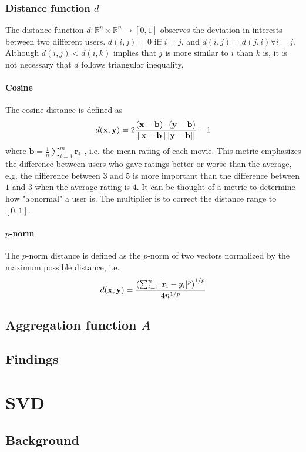 \documentclass[final]{cvpr}
\newcommand{\Par}[1]{\left(#1\right)}
\DeclarePairedDelimiter{\abs}{|}{|}
\DeclarePairedDelimiter{\norm}{\lVert}{\rVert}
\begin{document}
\subsubsection{Distance function $d$}
The distance function $d: \mathbb R^n \times \mathbb R^n \to [0, 1]$
observes the deviation in interests between two different users.
$d(i, j) = 0$ iff $i = j$, and $d(i, j) = d(j, i) \forall i = j$.
Although $d(i, j) < d(i, k)$ implies that $j$ is more similar to $i$ than $k$ is,
it is not necessary that $d$ follows triangular inequality.


\paragraph{Cosine}
The cosine distance is defined as
$$ d(\mathbf x, \mathbf y) = 2 \frac
{\Par{\mathbf x - \mathbf b} \cdot \Par{\mathbf y - \mathbf b}}
{\norm{\mathbf x - \mathbf b} \norm{\mathbf y - \mathbf b}} - 1 $$
where $\mathbf b = \frac1n \sum_{i=1}^m \mathbf r_{i\cdot}$,
i.e. the mean rating of each movie.
This metric emphasizes the difference between users who gave ratings better or worse than the average,
e.g. the difference between $3$ and $5$ is more important than the difference between $1$ and $3$
when the average rating is $4$.
It can be thought of a metric to determine how "abnormal" a user is.
The multiplier is to correct the distance range to $[0, 1]$.

\paragraph{$p$-norm}
The $p$-norm distance is defined as the $p$-norm of two vectors
normalized by the maximum possible distance, i.e.
$$ d(\mathbf x, \mathbf y) = \frac
{\Par{\sum_{i=1}^n \abs{x_i - y_i}^p}^{1/p}}
{4 n^{1/p}} $$

\subsection{Aggregation function $A$}


\subsection{Findings}

\section{\ac{SVD}}
\subsection{Background}
\end{document}
